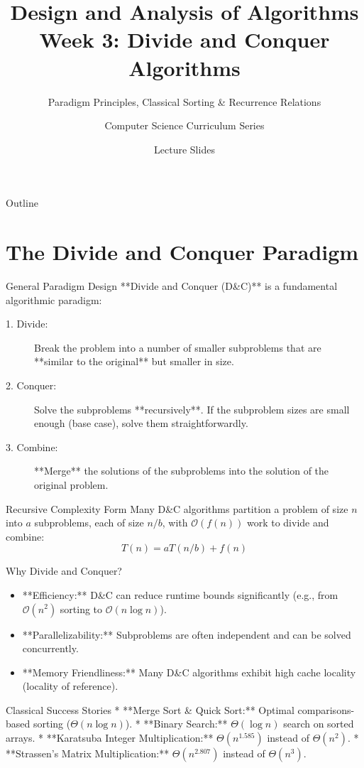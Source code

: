 \documentclass[aspectratio=169,xcolor=dvipsnames]{beamer}
\title[Algorithms -- Week 3]{\textbf{Design and Analysis of Algorithms}\\
\large Week 3: Divide and Conquer Algorithms}
\subtitle{Paradigm Principles, Classical Sorting \& Recurrence Relations}
\author{Computer Science Curriculum Series}
\date{Lecture Slides}
\begin{document}
\begin{frame}
  \titlepage
\end{frame}

\begin{frame}{Outline}
  \tableofcontents
\end{frame}

\section{The Divide and Conquer Paradigm}

\begin{frame}{General Paradigm Design}
  **Divide and Conquer (D\&C)** is a fundamental algorithmic paradigm:
  \begin{description}
    \item[1. Divide:] Break the problem into a number of smaller subproblems that are **similar to the original** but smaller in size.
    \item[2. Conquer:] Solve the subproblems **recursively**. If the subproblem sizes are small enough (base case), solve them straightforwardly.
    \item[3. Combine:] **Merge** the solutions of the subproblems into the solution of the original problem.
  \end{description}
  \begin{block}{Recursive Complexity Form}
    Many D\&C algorithms partition a problem of size $n$ into $a$ subproblems, each of size $n/b$, with $\mathcal{O}(f(n))$ work to divide and combine:
    $$T(n) = a T(n/b) + f(n)$$
  \end{block}
\end{frame}

\begin{frame}{Why Divide and Conquer?}
  \begin{itemize}
    \item **Efficiency:** D\&C can reduce runtime bounds significantly (e.g., from $\mathcal{O}(n^2)$ sorting to $\mathcal{O}(n \log n)$).
    \item **Parallelizability:** Subproblems are often independent and can be solved concurrently.
    \item **Memory Friendliness:** Many D\&C algorithms exhibit high cache locality (locality of reference).
  \end{itemize}
  \begin{exampleblock}{Classical Success Stories}
    * **Merge Sort \& Quick Sort:** Optimal comparisons-based sorting ($\Theta(n \log n)$).
    * **Binary Search:** $\Theta(\log n)$ search on sorted arrays.
    * **Karatsuba Integer Multiplication:** $\Theta(n^{1.585})$ instead of $\Theta(n^2)$.
    * **Strassen's Matrix Multiplication:** $\Theta(n^{2.807})$ instead of $\Theta(n^3)$.
  \end{exampleblock}
\end{frame}
\end{document}
